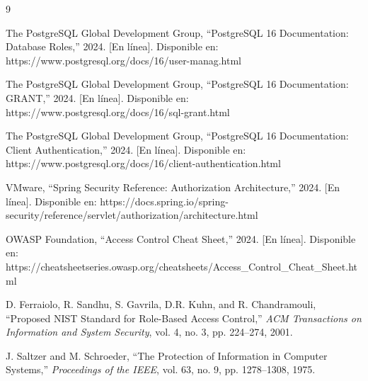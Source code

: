 \documentclass[conference, onecolumn]{IEEEtran}
\begin{document}
\begin{thebibliography}{9}

The PostgreSQL Global Development Group, ``PostgreSQL 16 Documentation: Database Roles,'' 2024. [En línea]. Disponible en: https://www.postgresql.org/docs/16/user-manag.html

The PostgreSQL Global Development Group, ``PostgreSQL 16 Documentation: GRANT,'' 2024. [En línea]. Disponible en: https://www.postgresql.org/docs/16/sql-grant.html

The PostgreSQL Global Development Group, ``PostgreSQL 16 Documentation: Client Authentication,'' 2024. [En línea]. Disponible en: https://www.postgresql.org/docs/16/client-authentication.html

VMware, ``Spring Security Reference: Authorization Architecture,'' 2024. [En línea]. Disponible en: https://docs.spring.io/spring-security/reference/servlet/authorization/architecture.html

OWASP Foundation, ``Access Control Cheat Sheet,'' 2024. [En línea]. Disponible en: https://cheatsheetseries.owasp.org/cheatsheets/Access\_Control\_Cheat\_Sheet.html

D. Ferraiolo, R. Sandhu, S. Gavrila, D.R. Kuhn, and R. Chandramouli, ``Proposed NIST Standard for Role-Based Access Control,'' \textit{ACM Transactions on Information and System Security}, vol. 4, no. 3, pp. 224--274, 2001.

J. Saltzer and M. Schroeder, ``The Protection of Information in Computer Systems,'' \textit{Proceedings of the IEEE}, vol. 63, no. 9, pp. 1278--1308, 1975.

\end{thebibliography}
\end{document}
